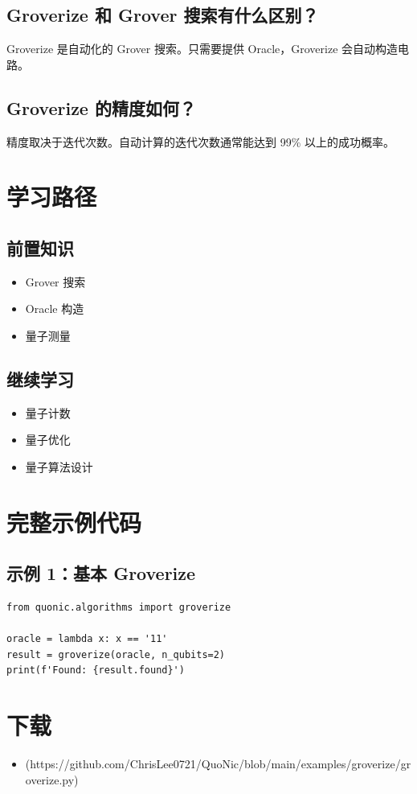 \documentclass[12pt,a4paper]{article}
\begin{document}
\subsection{Groverize 和 Grover 搜索有什么区别？}

Groverize 是自动化的 Grover 搜索。只需要提供 Oracle，Groverize 会自动构造电路。

\subsection{Groverize 的精度如何？}

精度取决于迭代次数。自动计算的迭代次数通常能达到 99\% 以上的成功概率。

\section{学习路径}

\subsection{前置知识}
\begin{itemize}
  \item Grover 搜索
  \item Oracle 构造
  \item 量子测量
\end{itemize}

\subsection{继续学习}
\begin{itemize}
  \item 量子计数
  \item 量子优化
  \item 量子算法设计
\end{itemize}

\section{完整示例代码}

\subsection{示例 1：基本 Groverize}

\begin{verbatim}
from quonic.algorithms import groverize

oracle = lambda x: x == '11'
result = groverize(oracle, n_qubits=2)
print(f'Found: {result.found}')
\end{verbatim}

\section{下载}

\begin{itemize}
  \item [groverize.py](https://github.com/ChrisLee0721/QuoNic/blob/main/examples/groverize/groverize.py)
\end{itemize}
\end{document}
